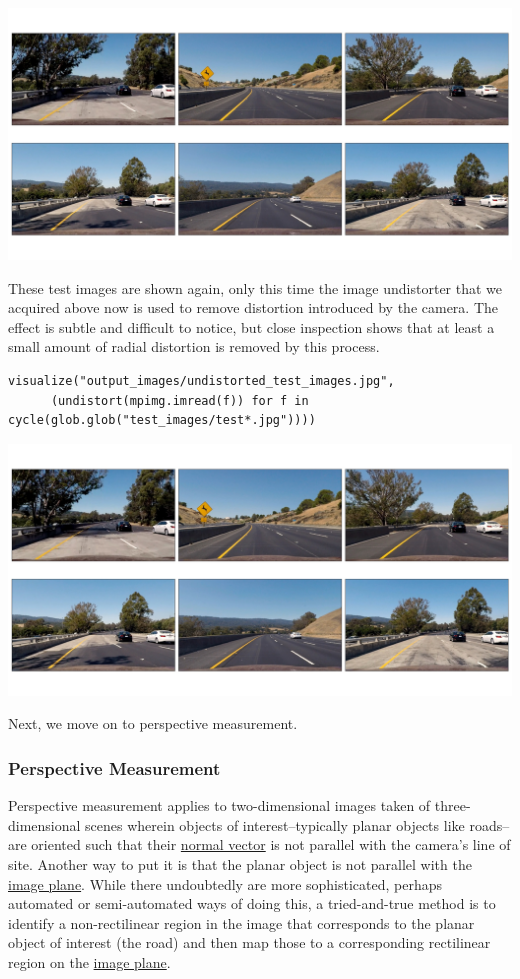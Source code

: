 \documentclass[11pt]{article}
\begin{document}
\includegraphics[width=.9\linewidth]{output_images/test_images.jpg}

These test images are shown again, only this time the image
undistorter that we acquired above now is used to remove
distortion introduced by the camera.  The effect is subtle and
difficult to notice, but close inspection shows that at least a
small amount of radial distortion is removed by this process.  

\begin{verbatim}
visualize("output_images/undistorted_test_images.jpg",
	  (undistort(mpimg.imread(f)) for f in cycle(glob.glob("test_images/test*.jpg"))))
\end{verbatim}

\includegraphics[width=.9\linewidth]{output_images/undistorted_test_images.jpg}

Next, we move on to perspective measurement.

\subsubsection*{Perspective Measurement}
\label{sec-1-2-3}

Perspective measurement applies to two-dimensional images taken
of three-dimensional scenes wherein objects of
interest--typically planar objects like roads--are oriented such
that their \href{http://mathworld.wolfram.com/NormalVector.html}{normal vector} is not parallel with the camera's line
of site.  Another way to put it is that the planar object is not
parallel with the \href{https://en.wikipedia.org/wiki/Image_plane}{image plane}.  While there undoubtedly are more
sophisticated, perhaps automated or semi-automated ways of doing
this, a tried-and-true method is to identify a non-rectilinear
region in the image that corresponds to the planar object of
interest (the road) and then map those to a corresponding
rectilinear region on the \href{https://en.wikipedia.org/wiki/Image_plane}{image plane}.  
\end{document}
